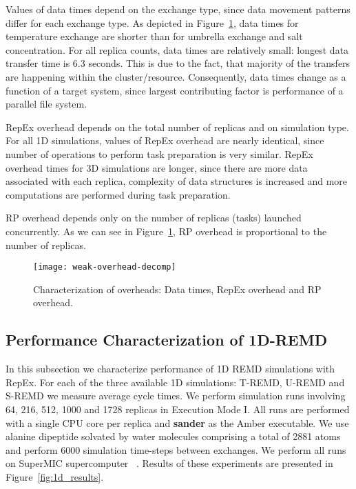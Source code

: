 \documentclass{sig-alternate-05-2015}
\begin{document}
Values of data times depend on the exchange type, since data movement patterns differ for each exchange type. As depicted in Figure~\ref{fig:overheads}, data times for temperature exchange are shorter than for umbrella exchange and salt concentration. For all replica counts, data times are relatively small: longest data transfer time is 6.3 seconds. This is due to the fact, that majority of the transfers are happening within the cluster/resource. Consequently, data times change as a function of a target system, since largest contributing factor is performance of a parallel file system.

RepEx overhead depends on the total number of replicas and on simulation type. For all 1D simulations, values of RepEx overhead are nearly identical, since number of operations to perform task preparation is very similar.  RepEx overhead times for 3D simulations are longer, since there are more data associated with each replica, complexity of data structures is increased and more computations are performed during task preparation. 

RP overhead depends only on the number of replicas (tasks) launched concurrently. As we can see in Figure~\ref{fig:overheads}, RP overhead is proportional to the number of replicas.   

\begin{figure}[ht!]
  \centering
  \texttt{[image: weak-overhead-decomp]}
  \caption{\small{Characterization of overheads: Data times, RepEx overhead and RP overhead. }
  }
  \label{fig:overheads}
\end{figure}

\subsection{Performance Characterization of 1D-REMD} \label{exp.1d-remd}

In this subsection we characterize performance of 1D REMD simulations with RepEx. For each of the three available 1D simulations: T-REMD, U-REMD and S-REMD we measure average cycle times. We perform simulation runs involving 64, 216, 512, 1000 and 1728 replicas in Execution Mode I. All runs are performed with a single CPU core per replica and \textbf{sander} as the Amber executable. We use alanine dipeptide solvated by water molecules comprising a total of 2881 atoms and perform 6000 simulation time-steps between exchanges. We perform all runs on SuperMIC supercomputer ~\cite{xsede}. Results of these experiments are presented in Figure~\ref{fig:1d_results}.
\end{document}
